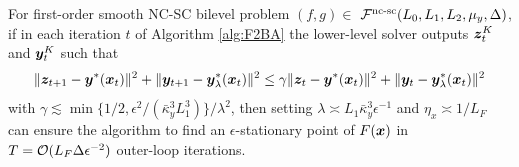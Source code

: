 \documentclass{article}
\begin{document}
\begin{lem}\label{lem:F2BA}
For first-order smooth NC-SC bilevel problem $(f,g) \in$ ${\mathcal{F}}^{\text{nc-sc}}(L_0,L_1,L_2,\mu_y,\Delta)$, 
if in each iteration $t$ of Algorithm \ref{alg:F2BA} the lower-level solver outputs 
${\bm{z}}_t^K$ and ${\bm{y}}_t^K$ such that 
\begin{align*}
    \Vert {\bm{z}}_{t+1} - {\bm{y}}^*({\bm{x}}_t) \Vert^2+ \Vert {\bm{y}}_{t+1} - {\bm{y}}_{\lambda}^*({\bm{x}}_t) \Vert^2 \le \gamma \Vert {\bm{z}}_t - {\bm{y}}^*({\bm{x}}_t) \Vert^2+ \Vert {\bm{y}}_t - {\bm{y}}_{\lambda}^*({\bm{x}}_t) \Vert^2
\end{align*}
with $\gamma \lesssim \min\{ 1/2, \epsilon^2/ (\bar \kappa_y^3 L_1^3) \} / \lambda^2$, then setting $\lambda \asymp L_1 \bar \kappa_y^3 \epsilon^{-1}$ and $\eta_x \asymp 1/L_F$ can ensure the algorithm to find an $\epsilon$-stationary point of $F({\bm{x}})$ in $T = {\mathcal{O}}( L_{F} \Delta \epsilon^{-2})$ outer-loop iterations.
\end{lem}


\end{document}
